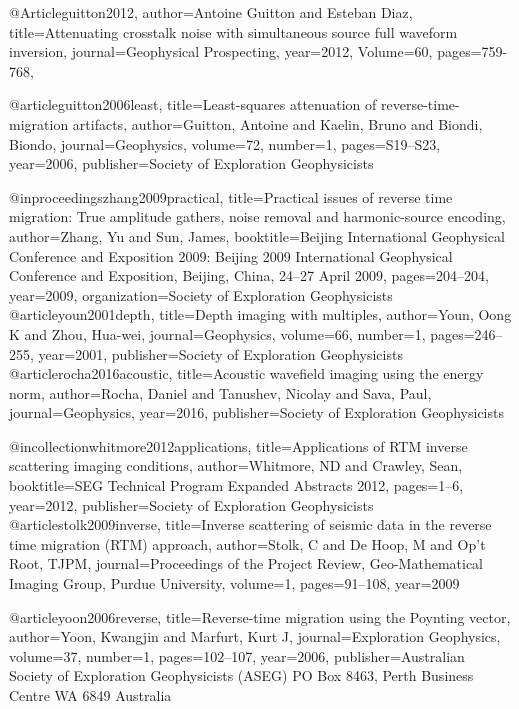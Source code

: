 {@Article{guitton2012,
  author={Antoine Guitton and Esteban Diaz},
  title={Attenuating crosstalk noise with simultaneous source full waveform inversion},
  journal={Geophysical Prospecting},
  year=2012,
  Volume=60,
  pages={759-768},
}

@article{guitton2006least,
  title={Least-squares attenuation of reverse-time-migration artifacts},
  author={Guitton, Antoine and Kaelin, Bruno and Biondi, Biondo},
  journal={Geophysics},
  volume={72},
  number={1},
  pages={S19--S23},
  year={2006},
  publisher={Society of Exploration Geophysicists}
}

@inproceedings{zhang2009practical,
  title={Practical issues of reverse time migration: True amplitude gathers, noise removal and harmonic-source encoding},
  author={Zhang, Yu and Sun, James},
  booktitle={Beijing International Geophysical Conference and Exposition 2009: Beijing 2009 International Geophysical Conference and Exposition, Beijing, China, 24--27 April 2009},
  pages={204--204},
  year={2009},
  organization={Society of Exploration Geophysicists}
}
@article{youn2001depth,
  title={Depth imaging with multiples},
  author={Youn, Oong K and Zhou, Hua-wei},
  journal={Geophysics},
  volume={66},
  number={1},
  pages={246--255},
  year={2001},
  publisher={Society of Exploration Geophysicists}
}
@article{rocha2016acoustic,
  title={Acoustic wavefield imaging using the energy norm},
  author={Rocha, Daniel and Tanushev, Nicolay and Sava, Paul},
  journal={Geophysics},
  year={2016},
  publisher={Society of Exploration Geophysicists}
}

@incollection{whitmore2012applications,
  title={Applications of RTM inverse scattering imaging conditions},
  author={Whitmore, ND and Crawley, Sean},
  booktitle={SEG Technical Program Expanded Abstracts 2012},
  pages={1--6},
  year={2012},
  publisher={Society of Exploration Geophysicists}
}
@article{stolk2009inverse,
  title={Inverse scattering of seismic data in the reverse time migration (RTM) approach},
  author={Stolk, C and De Hoop, M and Op’t Root, TJPM},
  journal={Proceedings of the Project Review, Geo-Mathematical Imaging Group, Purdue University},
  volume={1},
  pages={91--108},
  year={2009}
}

@article{yoon2006reverse,
  title={Reverse-time migration using the Poynting vector},
  author={Yoon, Kwangjin and Marfurt, Kurt J},
  journal={Exploration Geophysics},
  volume={37},
  number={1},
  pages={102--107},
  year={2006},
  publisher={Australian Society of Exploration Geophysicists (ASEG) PO Box 8463, Perth Business Centre WA 6849 Australia}
}

}
